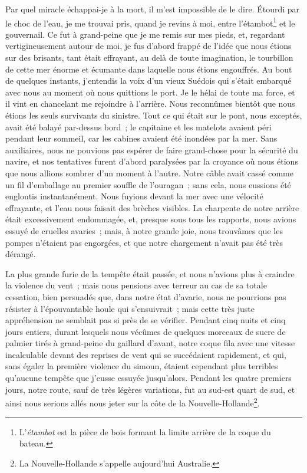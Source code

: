 \documentclass[french,twoside]{book} %
\begin{document}
Par quel miracle échappai-je à la mort, il m’est impossible de le dire. Étourdi par le choc de l’eau, je me trouvai pris, quand je revins à moi, entre l’étambot\footnote{L’\emph{étambot} est la pièce de bois formant la limite arrière de la coque du bateau.} et le gouvernail. Ce fut à grand-peine que je me remis sur mes pieds, et, regardant vertigineusement autour de moi, je fus d’abord frappé de l’idée que nous étions sur des brisants, tant était effrayant, au delà de toute imagination, le tourbillon de cette mer énorme et écumante dans laquelle nous étions engouffrés. Au bout de quelques instants, j’entendis la voix d’un vieux Suédois qui s’était embarqué avec nous au moment où nous quittions le port. Je le hélai de toute ma force, et il vint en chancelant me rejoindre à l’arrière. Nous reconnûmes bientôt que nous étions les seuls survivants du sinistre. Tout ce qui était sur le pont, nous exceptés, avait été balayé par-dessus bord ; le capitaine et les matelots avaient péri pendant leur sommeil, car les cabines avaient été inondées par la mer. Sans auxiliaires, nous ne pouvions pas espérer de faire grand-chose pour la sécurité du navire, et nos tentatives furent d’abord paralysées par la croyance où nous étions que nous allions sombrer d’un moment à l’autre. Notre câble avait cassé comme un fil d’emballage au premier souffle de l’ouragan ; sans cela, nous eussions été engloutis instantanément. Nous fuyions devant la mer avec une vélocité effrayante, et l’eau nous faisait des brèches visibles. La charpente de notre arrière était excessivement endommagée, et, presque sous tous les rapports, nous avions essuyé de cruelles avaries ; mais, à notre grande joie, nous trouvâmes que les pompes n’étaient pas engorgées, et que notre chargement n’avait pas été très dérangé.\par
La plus grande furie de la tempête était passée, et nous n’avions plus à craindre la violence du vent ; mais nous pensions avec terreur au cas de sa totale cessation, bien persuadés que, dans notre état d’avarie, nous ne pourrions pas résister à l’épouvantable houle qui s’ensuivrait ; mais cette très juste appréhension ne semblait pas si près de se vérifier. Pendant cinq nuits et cinq jours entiers, durant lesquels nous vécûmes de quelques morceaux de sucre de palmier tirés à grand-peine du gaillard d’avant, notre coque fila avec une vitesse incalculable devant des reprises de vent qui se succédaient rapidement, et qui, sans égaler la première violence du simoun, étaient cependant plus terribles qu’aucune tempête que j’eusse essuyée jusqu’alors. Pendant les quatre premiers jours, notre route, sauf de très légères variations, fut au sud-est quart de sud, et ainsi nous serions allés nous jeter sur la côte de la Nouvelle-Hollande\footnote{La Nouvelle-Hollande s’appelle aujourd’hui Australie.}.\par
\end{document}
